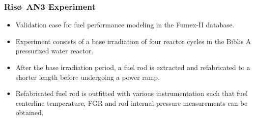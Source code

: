 \documentclass{beamer}
\begin{document}
\begin{frame}
\frametitle{Ris\o~AN3 Experiment}

\begin{itemize}
  \item Validation case for fuel performance modeling in the Fumex-II database.
  \item Experiment consists of a base irradiation of four reactor cycles in the Biblis A pressurized water reactor.
  \item After the base irradiation period, a fuel rod is extracted and refabricated to a shorter length before undergoing a power ramp.
  \item Refabricated fuel rod is outfitted with various instrumentation such that fuel centerline temperature, FGR and rod internal pressure measurements can be obtained.    
\end{itemize}

\end{frame}
\end{document}
